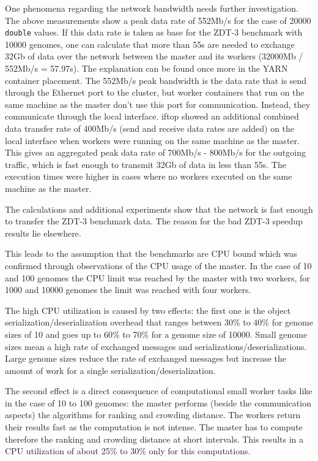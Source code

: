 One phenomena regarding the network bandwidth needs further investigation. The above measurements show a peak data rate of 552Mb/s for the case of 20000 \texttt{double} values. If this data rate is taken as base for the ZDT-3 benchmark with 10000 genomes, one can calculate that more than 55s are needed to exchange 32Gb of data over the network between the master and its workers (32000Mb / 552Mb/s = 57.97s). The explanation can be found once more in the YARN container placement. The 552Mb/s peak bandwidth is the data rate that is send through the Ethernet port to the cluster, but worker containers that run on the same machine as the master don't use this port for communication. Instead, they communicate through the local interface. iftop showed an additional combined data transfer rate of 400Mb/s (send and receive data rates are added) on the local interface when workers were running on the same machine as the master. This gives an aggregated peak data rate of 700Mb/s - 800Mb/s for the outgoing traffic, which is fast enough to transmit 32Gb of data in less than 55s. The execution times were higher in cases where no workers executed on the same machine as the master.

The calculations and additional experiments show that the network is fast enough to transfer the ZDT-3 benchmark data. The reason for the bad ZDT-3 speedup results lie elsewhere.

This leads to the assumption that the benchmarks are CPU bound which was confirmed through observations of the CPU usage of the master. In the case of 10 and 100 genomes the CPU limit was reached by the master with two workers, for 1000 and 10000 genomes the limit was reached with four workers.

The high CPU utilization is caused by two effects: the first one is the object serialization/deserialization overhead that ranges between 30\% to 40\% for genome sizes of 10 and goes up to 60\% to 70\% for a genome size of 10000. Small genome sizes mean a high rate of exchanged messages and serializations/deserializations. Large genome sizes reduce the rate of exchanged messages but increase the amount of work for a single serialization/deserialization.

The second effect is a direct consequence of computational small worker tasks like in the case of 10 to 100 genomes: the master performs (beside the communication aspects) the algorithms for ranking and crowding distance. The workers return their results fast as the computation is not intense. The master has to compute therefore the ranking and crowding distance at short intervals. This results in a CPU utilization of about 25\% to 30\% only for this computations.

